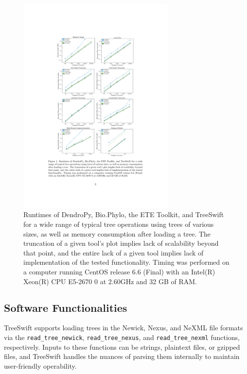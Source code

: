 \begin{figure} %
\centering
\includegraphics[width=0.7\textwidth]{figs/treeswift-comparison}
\caption[Runtime Comparison]
{Runtimes of DendroPy, Bio.Phylo, the ETE Toolkit, and TreeSwift for a wide range of typical tree operations using trees of various sizes, as well as memory consumption after loading a tree. The truncation of a given tool's plot implies lack of scalability beyond that point, and the entire lack of a given tool implies lack of implementation of the tested functionality. Timing was performed on a computer running CentOS release 6.6 (Final) with an Intel(R) Xeon(R) CPU E5-2670 0 at 2.60GHz and 32 GB of RAM.}
\label{fig:treeswift-comparison}
\end{figure}

\subsection{Software Functionalities}\label{sec:treeswift-functions}
TreeSwift supports loading trees in the Newick, Nexus, and NeXML file formats via the \texttt{read\_tree\_newick}, \texttt{read\_tree\_nexus}, and \texttt{read\_tree\_nexml} functions, respectively. Inputs to these functions can be strings, plaintext files, or gzipped files, and TreeSwift handles the nuances of parsing them internally to maintain user-friendly operability.

